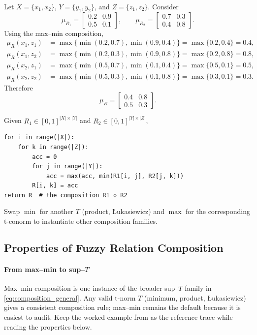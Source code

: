 Let \(X = \{x_1, x_2\}\), \(Y = \{y_1, y_2\}\), and \(Z = \{z_1, z_2\}\). Consider
\[
\mu_{R_1} = \begin{bmatrix}
0.2 & 0.9 \\
0.5 & 0.1
\end{bmatrix}, \qquad
\mu_{R_2} = \begin{bmatrix}
0.7 & 0.3 \\
0.4 & 0.8
\end{bmatrix}.
\]
Using the max--min composition,
\begin{align*}
\mu_R(x_1, z_1) &= \max\{\min(0.2,0.7), \min(0.9,0.4)\} = \max\{0.2, 0.4\} = 0.4, \\
\mu_R(x_1, z_2) &= \max\{\min(0.2,0.3), \min(0.9,0.8)\} = \max\{0.2, 0.8\} = 0.8, \\
\mu_R(x_2, z_1) &= \max\{\min(0.5,0.7), \min(0.1,0.4)\} = \max\{0.5, 0.1\} = 0.5, \\
\mu_R(x_2, z_2) &= \max\{\min(0.5,0.3), \min(0.1,0.8)\} = \max\{0.3, 0.1\} = 0.3.
\end{align*}
Therefore
\[
\mu_R = \begin{bmatrix}
0.4 & 0.8 \\
0.5 & 0.3
\end{bmatrix}.
\]

\begin{tcolorbox}[summarybox, title={Max--min composition as ``fuzzy matrix multiply''}]
Given \(R_1 \in [0,1]^{|X|\times|Y|}\) and \(R_2 \in [0,1]^{|Y|\times|Z|}\),
\begin{verbatim}
for i in range(|X|):
    for k in range(|Z|):
        acc = 0
        for j in range(|Y|):
            acc = max(acc, min(R1[i, j], R2[j, k]))
        R[i, k] = acc
return R  # the composition R1 o R2
\end{verbatim}
Swap \(\min\) for another \(T\) (product, \L{}ukasiewicz) and \(\max\) for the corresponding t\hyp{}conorm to instantiate other composition families.
\end{tcolorbox}
\subsection{Properties of Fuzzy Relation Composition}
\label{sec:fuzzyrelations_properties_of_fuzzy_relation_composition}

\paragraph{From max--min to sup--\(T\)}
\label{sec:fuzzyrelations_recap_and_motivation}
Max--min composition is one instance of the broader sup--\(T\) family in \eqref{eq:composition_general}. Any valid t\hyp{}norm \(T\) (minimum, product, \L{}ukasiewicz) gives a consistent composition rule; max--min remains the default because it is easiest to audit. Keep the worked example from  as the reference trace while reading the properties below.

